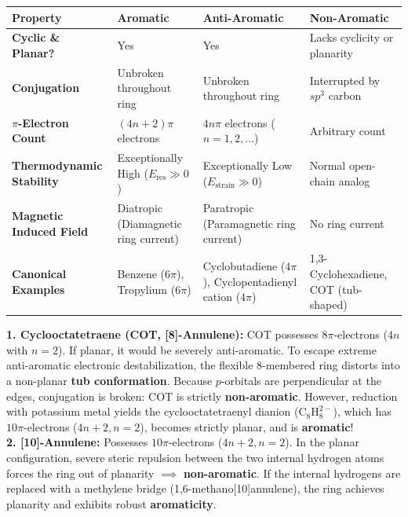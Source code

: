 \documentclass[10pt,twoside,openright]{book}
\begin{document}
\begin{formulabox}
{\footnotesize\setlength{\tabcolsep}{2.5pt}
\begin{tabularx}{\linewidth}{|l|Y|Y|Y|}
\hline
\textbf{Property} & \textbf{Aromatic} & \textbf{Anti-Aromatic} & \textbf{Non-Aromatic} \\
\hline
\textbf{Cyclic \& Planar?} & Yes & Yes & Lacks cyclicity or planarity \\
\hline
\textbf{Conjugation} & Unbroken throughout ring & Unbroken throughout ring & Interrupted by $sp^3$ carbon \\
\hline
\textbf{$\pi$-Electron Count} & $(4n+2)\pi$ electrons & $4n\pi$ electrons ($n=1,2,\dots$) & Arbitrary count \\
\hline
\textbf{Thermodynamic Stability} & Exceptionally High ($E_{\mathrm{res}} \gg 0$) & Exceptionally Low ($E_{\mathrm{strain}} \gg 0$) & Normal open-chain analog \\
\hline
\textbf{Magnetic Induced Field} & Diatropic (Diamagnetic ring current) & Paratropic (Paramagnetic ring current) & No ring current \\
\hline
\textbf{Canonical Examples} & Benzene ($6\pi$), Tropylium ($6\pi$) & Cyclobutadiene ($4\pi$), Cyclopentadienyl cation ($4\pi$) & 1,3-Cyclohexadiene, COT (tub-shaped) \\
\hline
\end{tabularx}}
\end{formulabox}

\begin{trapbox}
\textbf{1. Cyclooctatetraene (COT, [8]-Annulene):}
COT possesses $8\pi$-electrons ($4n$ with $n=2$). If planar, it would be severely anti-aromatic. To escape extreme anti-aromatic electronic destabilization, the flexible 8-membered ring distorts into a non-planar \textbf{tub conformation}. Because $p$-orbitals are perpendicular at the edges, conjugation is broken: COT is strictly \textbf{non-aromatic}. However, reduction with potassium metal yields the cyclooctatetraenyl dianion ($\mathrm{C_8H_8^{2-}}$), which has $10\pi$-electrons ($4n+2, n=2$), becomes strictly planar, and is \textbf{aromatic}!\\
\textbf{2. [10]-Annulene:}
Possesses $10\pi$-electrons ($4n+2, n=2$). In the planar configuration, severe steric repulsion between the two internal hydrogen atoms forces the ring out of planarity $\implies$ \textbf{non-aromatic}. If the internal hydrogens are replaced with a methylene bridge (1,6-methano[10]annulene), the ring achieves planarity and exhibits robust \textbf{aromaticity}.
\end{trapbox}
\end{document}
